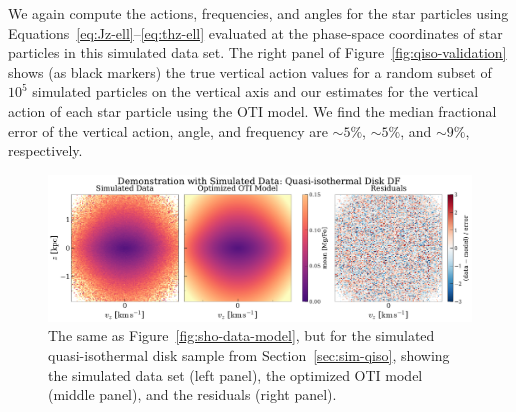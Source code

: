 We again compute the actions, frequencies, and angles for the star particles using
Equations~\ref{eq:Jz-ell}--\ref{eq:thz-ell} evaluated at the phase-space coordinates of
star particles in this simulated data set.
The right panel of Figure~\ref{fig:qiso-validation} shows (as black markers) the true
vertical action values for a random subset of $10^5$ simulated particles on the vertical
axis and our estimates for the vertical action of each star particle using the OTI
model.
We find the median fractional error of the vertical action, angle, and frequency are
$\sim 5\%$, $\sim 5\%$, and $\sim 9\%$, respectively. 


\begin{figure}[t!]
\begin{center}
\includegraphics[width=\textwidth]{qiso-data-model.pdf}
\end{center}
\caption{%
The same as Figure~\ref{fig:sho-data-model}, but for the simulated quasi-isothermal disk
sample from Section~\ref{sec:sim-qiso}, showing the simulated data set (left panel), the
optimized OTI model (middle panel), and the residuals (right panel).
\label{fig:qiso-data-model}
}
\end{figure}

